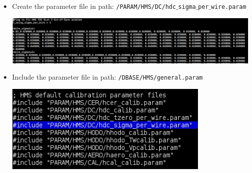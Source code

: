 \documentclass[11pt]{article}
\begin{document}
\begin{itemize}
\item  Create the parameter file in path: \texttt{/PARAM/HMS/DC/hdc$\_$sigma$\_$per$\_$wire.param} \par
  \begin{minipage}{\linewidth}
    \centering
    \includegraphics[width=15cm]{param.png}
    \label{fig:param}
  \end{minipage}
\item  Include the parameter file in path: \texttt{/DBASE/HMS/general.param} \par
  \begin{minipage}{\linewidth}                                                          
    \centering
    \includegraphics[width=10cm]{gen_parm.png}
    \label{fig:gen_param}
  \end{minipage}
\end{itemize}
\newpage
\onecolumn


\end{document}
